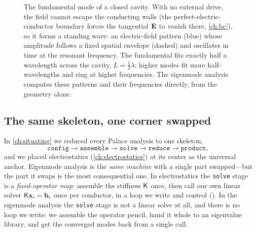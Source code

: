 \begin{figure}[t]
\centering
{}
\caption[A cavity's lowest mode]{The fundamental mode of a closed cavity. With no
external drive, the field cannot escape the conducting walls (the perfect-electric-conductor
boundary forces the tangential $\mathbf{E}$ to vanish there, \cref{ch:bc}), so it forms a
standing wave: an electric-field pattern (blue) whose amplitude follows a fixed
spatial envelope (dashed) and oscillates in time at the resonant frequency. The
fundamental fits exactly half a wavelength across the cavity, $L=\tfrac12\lambda$;
higher modes fit more half-wavelengths and ring at higher frequencies. The
eigenmode analysis computes these patterns and their frequencies directly, from
the geometry alone.}
\label{fig:cavity-setup}
\end{figure}

\subsection{The same skeleton, one corner swapped}

In \cref{ch:situating} we reduced every Palace analysis to one skeleton,
\[
  \texttt{config} \to \texttt{assemble} \to \texttt{solve}
  \to \texttt{reduce} \to \texttt{product},
\]
and we placed electrostatics (\cref{ch:electrostatics}) at its center as the
universal anchor. Eigenmode analysis is the \emph{same machine} with a single
part swapped---but the part it swaps is the most consequential one. In
electrostatics the \texttt{solve} stage is a \emph{fixed-operator map}: assemble
the stiffness $\mathsf{K}$ once, then call our own linear solver $\mathsf{K}\mathbf{x}_i=\mathbf{b}_i$ once
per conductor, in a loop we write and control (). In the
eigenmode analysis the \texttt{solve} stage is not a linear solve at all, and
there is no loop we write: we assemble the operator pencil, hand it whole to an
eigenvalue library, and get the converged modes back from a single call.

